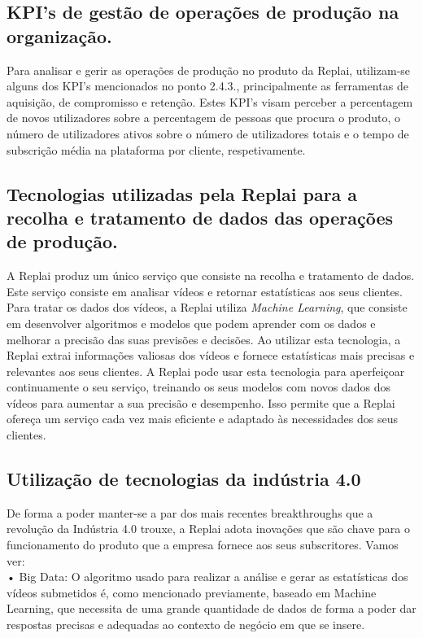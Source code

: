 \subsection{KPI’s de gestão de operações de produção na organização.}
Para analisar e gerir as operações de produção no produto da Replai, utilizam-se alguns dos KPI’s mencionados no ponto 2.4.3., principalmente as ferramentas de aquisição, de compromisso e retenção. Estes KPI’s visam perceber a percentagem de novos utilizadores sobre a percentagem de pessoas que procura o produto, o número de utilizadores ativos sobre o número de utilizadores totais e o tempo de subscrição média na plataforma por cliente, respetivamente. 

\subsection{Tecnologias utilizadas pela Replai para a recolha e tratamento de dados das operações de produção.}

A Replai produz um único serviço que consiste na recolha e tratamento de dados. Este serviço consiste em analisar vídeos e retornar estatísticas aos seus clientes. Para tratar os dados dos vídeos, a Replai utiliza \textit{Machine Learning}, que consiste em desenvolver algoritmos e modelos que podem aprender com os dados e melhorar a precisão das suas previsões e decisões. Ao utilizar esta tecnologia, a Replai extrai informações valiosas dos vídeos e fornece estatísticas mais precisas e relevantes aos seus clientes. A Replai pode usar esta tecnologia para aperfeiçoar continuamente o seu serviço, treinando os seus modelos com novos dados dos vídeos para aumentar a sua precisão e desempenho. Isso permite que a Replai ofereça um serviço cada vez mais eficiente e adaptado às necessidades dos seus clientes.

\subsection{Utilização de tecnologias da indústria 4.0}

De forma a poder manter-se a par dos mais recentes breakthroughs que a revolução da Indústria 4.0 trouxe, a Replai adota inovações que são chave para o funcionamento do produto que a empresa fornece aos seus subscritores. Vamos ver:\\

•	Big Data: O algoritmo usado para realizar a análise e gerar as estatísticas dos vídeos submetidos é, como mencionado previamente, baseado em Machine Learning, que necessita de uma grande quantidade de dados de forma a poder dar respostas precisas e adequadas ao contexto de negócio em que se insere.\\

